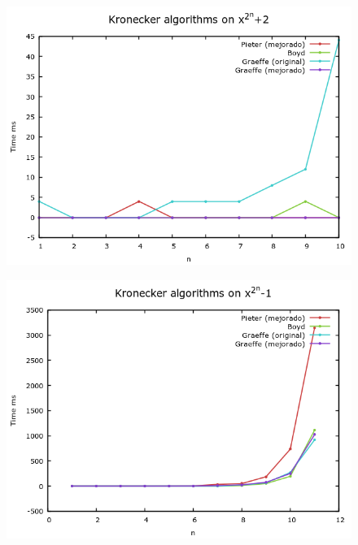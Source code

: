 \documentclass[10pt,compress]{beamer}
\begin{document}
  \begin{frame}
    \begin{figure}[H]
      \centering
      \includegraphics[width=\textwidth]{./images/fast_4.png}      
    \end{figure}
  \end{frame}

  \begin{frame}
    \begin{figure}[H]
      \centering
      \includegraphics[width=\textwidth]{./images/fast_1.png}      
    \end{figure}
  \end{frame}
\end{document}
